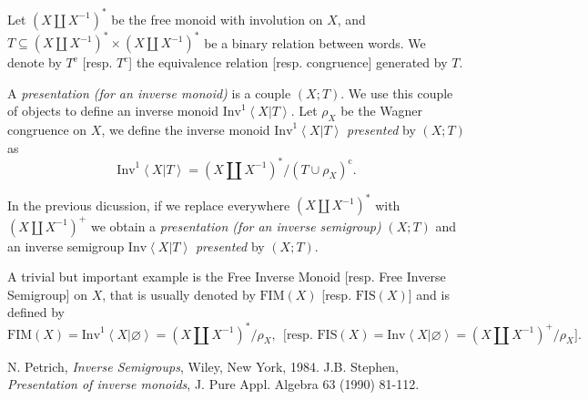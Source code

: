 \documentclass[12pt]{article}
\begin{document}
\newcommand{\e}{\mathrm{e}}
\newcommand{\co}{\mathrm{c}}

\newcommand{\cbra}[1]{\left( #1 \right)}
\newcommand{\qbra}[1]{\left[ #1 \right]}
\newcommand{\gbra}[1]{\left\{ #1 \right\}}
\newcommand{\abra}[1]{\left\langle #1 \right\rangle}

\newcommand{\mipres}[2]{\mathrm{Inv}^1\abra{#1 | #2}}
\newcommand{\sipres}[2]{\mathrm{Inv}\abra{#1 | #2}}

\newcommand{\double}[1]{\cbra{#1\amalg #1^{-1}}}
\newcommand{\doubles}[1]{\cbra{#1\amalg #1^{-1}}^\ast}
\newcommand{\doublep}[1]{\cbra{#1\amalg #1^{-1}}^+}
\newcommand{\fim}{\mathrm{FIM}}
\newcommand{\fis}{\mathrm{FIS}}


Let $\doubles{X}$  be the free monoid  
with involution on $X$, and  $T\subseteq \doubles X\times \doubles X$ be a binary relation between words. We denote by $T^\e$ [resp. $T^\co$] the equivalence relation [resp. congruence] generated by $T$.

A \emph{presentation (for an inverse monoid)} is a couple $(X;T)$. We use this couple of objects to define an inverse monoid $\mipres{X}{T}$. Let $\rho_X$ be the Wagner congruence on $X$, we define the inverse monoid $\mipres{X}{T}$ \emph{presented} by $(X;T)$ as $$\mipres{X}{T}=\doubles{X}/(T\cup\rho_X)^\co.$$

In the previous dicussion, if we replace everywhere $\doubles X$ with $\doublep X$ we obtain a \emph{presentation (for an inverse semigroup)} $(X;T)$ and an inverse semigroup $\sipres{X}{T}$ \emph{presented} by $(X;T)$.

A trivial but important example is the Free Inverse Monoid [resp. Free Inverse Semigroup] on $X$, that is usually denoted by $\fim(X)$ [resp. $\fis(X)$] and is defined by $$\fim(X)=\mipres{X}{\varnothing}=\doubles{X}/\rho_X,\ \ \mbox{[resp. $\fis(X)=\sipres{X}{\varnothing}=\doublep{X}/\rho_X$]}.$$


\begin{thebibliography}{9}
 N. Petrich, \emph{Inverse Semigroups}, Wiley, New York, 1984.
 J.B. Stephen, \emph{Presentation of inverse monoids}, J. Pure Appl. Algebra 63 (1990) 81-112.
\end{thebibliography}
\end{document}

